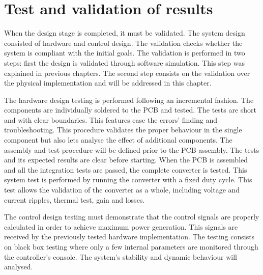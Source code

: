 
\chapter{Test and validation of results} \label{ch:test_validation}

When the design stage is completed, it must be validated. The system design consisted of hardware and control design. The validation checks whether the system is compliant with the initial goals. The validation is performed in two steps: first the design is validated through software simulation. This step was explained in previous chapters. The second step consists on the validation over the physical implementation and will be addressed in this chapter.

The hardware design testing is performed following an incremental fashion. The components are individually soldered to the PCB and tested. The tests are short and with clear boundaries. This features ease the errors' finding and troubleshooting. This procedure validates the proper behaviour in the single component but also lets analyse the effect of additional components. The assembly and test procedure will be defined prior to the PCB assembly. The tests and its expected results are clear before starting. When the PCB is assembled and all the integration tests are passed, the complete converter is tested. This system test is performed by running the converter with a fixed duty cycle. This test allows the validation of the converter as a whole, including voltage and current ripples, thermal test, gain and losses.

The control design testing must demonstrate that the control signals are properly calculated in order to achieve maximum power generation. This signals are received by the previously tested hardware implementation. The testing consists on black box testing where only a few internal parameters are monitored through the controller's console. The 
system's stability and dynamic behaviour will analysed.



